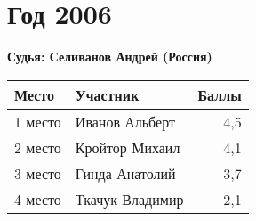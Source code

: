 \chapter{Год 2006}
\textbf{Судья: Селиванов Андрей (Россия)}

\begin{tabularx}{\textwidth}{l l r}
Место & Участник & Баллы \\
\hline
1 место & Иванов Альберт & 4,5 \\
2 место & Кройтор Михаил & 4,1 \\
3 место & Гинда Анатолий & 3,7 \\
4 место & Ткачук Владимир & 2,1 \\
\end{tabularx}